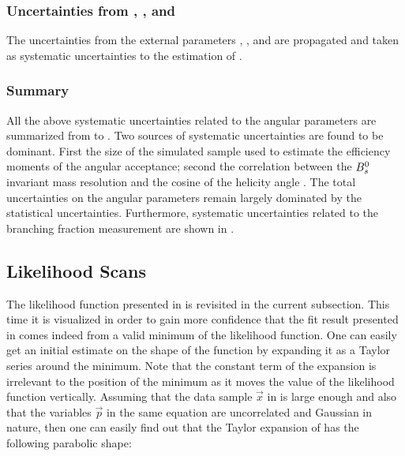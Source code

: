 \subsubsection{Uncertainties from \fdfs, \BRof\BdJpsiKst, and \BRof\BsJpsiPhi}
The uncertainties from the external parameters \fdfs, \BRof\BdJpsiKst, and \BRof\BsJpsiPhi are
propagated and taken as systematic uncertainties to the estimation of \BRof\BsJpsiKst.

\subsubsection{Summary}
\label{systSummary}
All the above systematic uncertainties related to the angular parameters are summarized from 
to . Two sources of systematic uncertainties are found to be dominant. First the size
of the simulated sample used to estimate the efficiency moments of the angular acceptance; second the correlation
between the $B^0_s$ invariant mass resolution and the cosine of the helicity angle \thetamu. The total uncertainties
on the angular parameters remain largely dominated by the statistical uncertainties. Furthermore, systematic
uncertainties related to the branching fraction measurement are shown in .

\subsection{Likelihood Scans}
\label{nllscans}

The likelihood function presented in  is revisited in the current subsection.
This time it is visualized in order to gain more confidence that the fit result presented in 
comes indeed from a valid minimum of the likelihood function. One can easily get an initial estimate on the shape
of the function by expanding it as a Taylor series around the minimum. Note that the constant term of the
expansion is irrelevant to the position of the minimum as it moves the value of the likelihood function vertically.
Assuming that the data sample $\vec{x}$ in  is large enough and also that the variables $\vec{p}$
in the same equation are uncorrelated and Gaussian in nature, then one can easily find out that the Taylor expansion
of  has the following parabolic shape:

